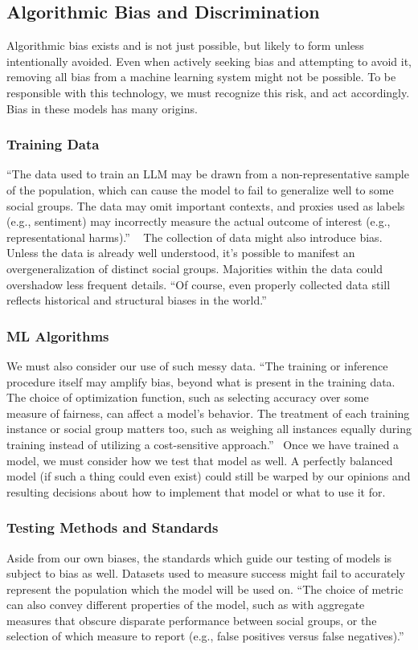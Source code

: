 \documentclass[sigconf, 10pt]{acmart}
\begin{document}
\subsection{Algorithmic Bias and Discrimination}
Algorithmic bias exists and is not just possible, but likely to form unless intentionally avoided. Even when actively seeking bias and attempting to avoid it, removing all bias from a machine learning system might not be possible. To be responsible with this technology, we must recognize this risk, and act accordingly. Bias in these models has many origins.
\subsubsection{Training Data}
“The data used to train an LLM may be drawn from a non-representative sample of the population, which can cause the model to fail to generalize well to some social groups. The data may omit important contexts, and proxies used as labels (e.g., sentiment) may incorrectly measure the actual outcome of interest (e.g., representational harms).” ~\cite{used_first(0)} The collection of data might also introduce bias. Unless the data is already well understood, it’s possible to manifest an overgeneralization of distinct social groups. Majorities within the data could overshadow less frequent details. “Of course, even properly collected data still reflects historical and structural biases in the world.” ~\cite{used_first(0)}
\subsubsection{ML Algorithms}
We must also consider our use of such messy data. “The training or inference procedure itself may amplify bias, beyond what is present in the training data. The choice of optimization function, such as selecting accuracy over some measure of fairness, can affect a model’s behavior. The treatment of each training instance or social group matters too, such as weighing all instances equally during training instead of utilizing a cost-sensitive approach.”~\cite{used_first(0)} Once we have trained a model, we must consider how we test that model as well. A perfectly balanced model (if such a thing could even exist) could still be warped by our opinions and resulting decisions about how to implement that model or what to use it for.
\subsubsection{Testing Methods and Standards}
Aside from our own biases, the standards which guide our testing of models is subject to bias as well. Datasets used to measure success might fail to accurately represent the population which the model will be used on. “The choice of metric can also convey different properties of the model, such as with aggregate measures that obscure disparate performance between social groups, or the selection of which measure to report (e.g., false positives versus false negatives).” ~\cite{used_first(0)}
\end{document}
